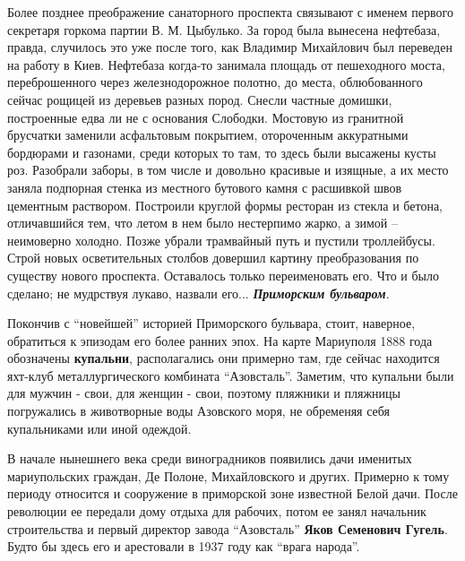 Более позднее преображение санаторного проспекта связывают с именем первого
секретаря горкома партии В. М. Цыбулько. За город была вынесена нефтебаза,
правда, случилось это уже после того, как Владимир Михайлович был переведен на
работу в Киев. Нефтебаза когда-то занимала площадь от пешеходного моста,
переброшенного через железнодорожное полотно, до места, облюбованного сейчас
рощицей из деревьев разных пород. Снесли частные домишки, построенные едва ли
не с основания Слободки. Мостовую из гранитной брусчатки заменили асфальтовым
покрытием, отороченным аккуратными бордюрами и газонами, среди которых то там,
то здесь были высажены кусты роз. Разобрали заборы, в том числе и довольно
красивые и изящные, а их место заняла подпорная стенка из местного бутового
камня с расшивкой швов цементным раствором. Построили круглой формы ресторан из
стекла и бетона, отличавшийся тем, что летом в нем было нестерпимо жарко, а
зимой – неимоверно холодно. Позже убрали трамвайный путь и пустили троллейбусы.
Строй новых осветительных столбов довершил картину преобразования по существу
нового проспекта. Оставалось только переименовать его. Что и было сделано; не
мудрствуя лукаво, назвали его... \textbf{\em Приморским бульваром}.

Покончив с \enquote{новейшей} историей Приморского бульвара, стоит, наверное,
обратиться к эпизодам его более ранних эпох. На карте Мариуполя 1888 года
обозначены \textbf{купальни}, располагались они примерно там, где сейчас находится
яхт-клуб металлургического комбината \enquote{Азовсталь}. Заметим, что купальни были
для мужчин - свои, для женщин - свои, поэтому пляжники и пляжницы погружались в
животворные воды Азовского моря, не обременяя себя купальниками или иной
одеждой.

В начале нынешнего века среди виноградников появились дачи именитых
мариупольских граждан, Де Полоне, Михайловского и других. Примерно к тому
периоду относится и сооружение в приморской зоне известной Белой дачи. После
революции ее передали дому отдыха для рабочих, потом ее занял начальник
строительства и первый директор завода \enquote{Азовсталь} \textbf{Яков Семенович Гугель}. Будто
бы здесь его и арестовали в 1937 году как \enquote{врага народа}. 

